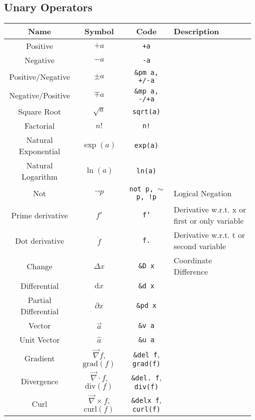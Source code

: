 \documentclass{article}
\newcommand{\tttilde}{{\footnotesize $\sim$}}
\begin{document}
  \newpage

  \subsection{Unary Operators} %
  \label{sub:unary_ops}
  \begin{table}[!h]
    \centering
    \begin{tabular}{|c|c|c|l|}
      \hline
      \textbf{Name} & \textbf{Symbol} & \textbf{Code} & \textbf{Description} \\
      \hline\hline

      Positive & \( +a \) & \texttt{+a} & \\
      Negative & \( -a \) & \texttt{-a} & \\
      Positive/Negative & \( \pm a \) & \texttt{\&pm a, +/-a} & \\
      Negative/Positive & \( \mp a \) & \texttt{\&mp a, -/+a} & \\
      Square Root & \( \sqrt{a} \) & \texttt{sqrt(a)} & \\
      Factorial & \( n! \) & \texttt{n!} & \\
      Natural Exponential & \( \exp(a) \) & \texttt{exp(a)} & \\
      Natural Logarithm & \( \ln(a) \) & \texttt{ln(a)} & \\
      Not & \( \neg p \) & \texttt{not p, \tttilde p, !p} & Logical Negation \\
      \hline
      Prime derivative & \( f' \) & \texttt{f'} & Derivative w.r.t. x or first or only variable\\
      Dot derivative & \( \dot{f} \) & \texttt{f.} & Derivative w.r.t. t or second variable\\
      Change & \( \Delta x \) & \texttt{\&D x} & Coordinate Difference \\
      Differential & \( \mathrm{d}x \) & \texttt{\&d x} & \\
      Partial Differential & \( \partial x \) & \texttt{\&pd x} & \\
      Vector & \( \vec{a} \) & \texttt{\&v a} & \\
      Unit Vector & \( \hat{a} \) & \texttt{\&u a} & \\
      \hline
      Gradient & \( \vec{\nabla} f \), \( \mathrm{grad}(f) \) & \texttt{\&del f}, \texttt{grad(f)} & \\
      Divergence & \( \vec{\nabla} \cdot f \), \( \mathrm{div}(f) \) & \texttt{\&del.~f}, \texttt{div(f)} & \\
      Curl & \( \vec{\nabla} \times f \), \( \mathrm{curl}(f) \) & \texttt{\&delx f}, \texttt{curl(f)} & \\
      \hline
    \end{tabular}
  \end{table}
\end{document}
